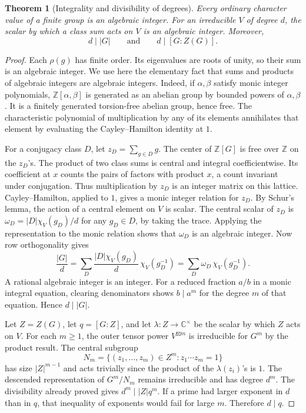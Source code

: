 \documentclass[11pt,oneside,openany]{book}
\newtheorem{theorem}{Theorem}[chapter]
\theoremstyle{definition}
\theoremstyle{remark}
\begin{document}
\begin{theorem}[Integrality and divisibility of degrees]
\label{p103:ALG-07-C02-S03}
Every ordinary character value of a finite group is an algebraic
integer. For an irreducible \(V\) of degree \(d\), the scalar by
which a class sum acts on \(V\) is an algebraic integer. Moreover,
\[
 d\mid |G| \qquad\text{and}\qquad d\mid [G:Z(G)] .
\]
\end{theorem}

\begin{proof}
Each \(\rho(g)\) has finite order. Its eigenvalues are roots of unity,
so their sum is an algebraic integer. We use here the elementary
fact that sums and products of algebraic integers are algebraic
integers. Indeed, if \(\alpha,\beta\) satisfy monic integer polynomials,
\(\mathbb Z[\alpha,\beta]\) is generated as an abelian group by
bounded powers of \(\alpha,\beta\). It is a finitely generated
torsion-free abelian group, hence free. The characteristic polynomial
of multiplication by any of its elements annihilates that element
by evaluating the Cayley--Hamilton identity at \(1\).

For a conjugacy class \(D\), let \(z_D=\sum_{g\in D}g\).
The center of \(\mathbb Z[G]\) is free over \(\mathbb Z\) on the
\(z_D\)'s. The product of two class sums is central and integral
coefficientwise. Its coefficient at \(x\) counts the pairs of
factors with product \(x\), a count invariant under conjugation.
Thus multiplication by \(z_D\) is an integer matrix on this lattice.
Cayley--Hamilton, applied to \(1\), gives a monic integer relation
for \(z_D\). By Schur's lemma, the action of a central element on
\(V\) is scalar. The central scalar of \(z_D\) is
\(\omega_D=|D|\chi_V(g_D)/d\) for any \(g_D\in D\), by taking the
trace. Applying the representation to the monic relation shows
that \(\omega_D\) is an algebraic integer. Now row orthogonality gives
\[
 \frac{|G|}{d}
   =\sum_D \frac{|D|\chi_V(g_D)}{d}\,\chi_V(g_D^{-1})
   =\sum_D\omega_D\,\chi_V(g_D^{-1}).
\]
A rational algebraic integer is an integer. For a reduced fraction
\(a/b\) in a monic integral equation, clearing denominators shows
\(b\mid a^m\) for the degree \(m\) of that equation. Hence \(d\mid |G|\).

Let \(Z=Z(G)\), let \(q=[G:Z]\), and let
\(\lambda\colon Z\to\mathbb C^\times\) be the scalar by which \(Z\)
acts on \(V\). For each \(m\ge1\), the outer tensor power
\(V^{\boxtimes m}\) is irreducible for \(G^m\) by the product result.
The central subgroup
\[
 N_m=\{(z_1,\ldots,z_m)\in Z^m:z_1\cdots z_m=1\}
\]
has size \(|Z|^{m-1}\) and acts trivially since the product of the
\(\lambda(z_i)\)'s is \(1\). The descended representation of \(G^m/N_m\)
remains irreducible and has degree \(d^m\). The divisibility already
proved gives \(d^m\mid |Z|q^m\). If a prime had larger exponent in
\(d\) than in \(q\), that inequality of exponents would fail for
large \(m\). Therefore \(d\mid q\).
\end{proof}
\end{document}

